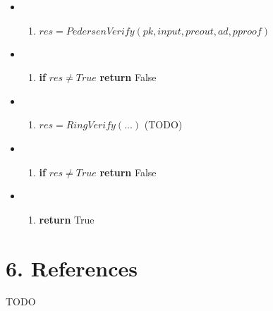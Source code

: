 \documentclass[
]{article}
\providecommand{\tightlist}{%
  \setlength{\itemsep}{0pt}\setlength{\parskip}{0pt}}
\begin{document}
\begin{itemize}
\item
  \begin{enumerate}
  \def\labelenumi{\arabic{enumi}.}
  \tightlist
  \item
    \(res = PedersenVerify(pk, input, preout, ad, pproof)\)
  \end{enumerate}
\item
  \begin{enumerate}
  \def\labelenumi{\arabic{enumi}.}
  \setcounter{enumi}{1}
  \tightlist
  \item
    \textbf{if} \(res \neq True\) \textbf{return} False
  \end{enumerate}
\item
  \begin{enumerate}
  \def\labelenumi{\arabic{enumi}.}
  \setcounter{enumi}{2}
  \tightlist
  \item
    \(res = RingVerify(...)\) (TODO)
  \end{enumerate}
\item
  \begin{enumerate}
  \def\labelenumi{\arabic{enumi}.}
  \setcounter{enumi}{3}
  \tightlist
  \item
    \textbf{if} \(res \neq True\) \textbf{return} False
  \end{enumerate}
\item
  \begin{enumerate}
  \def\labelenumi{\arabic{enumi}.}
  \setcounter{enumi}{3}
  \tightlist
  \item
    \textbf{return} True
  \end{enumerate}
\end{itemize}

\hypertarget{references}{%
\section{6. References}\label{references}}

TODO
\end{document}
